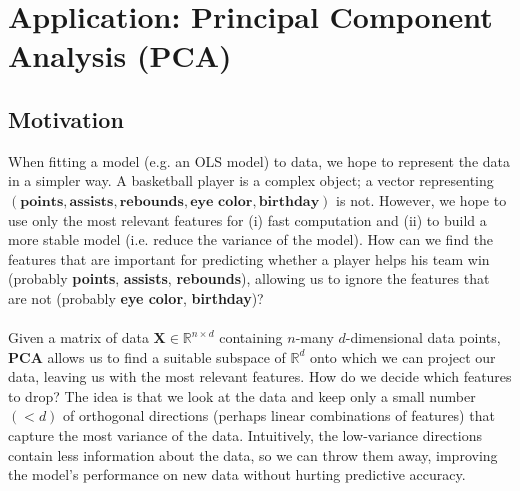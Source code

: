 \documentclass{article}
\begin{document}
\newpage
\section{Application: Principal Component Analysis (PCA)}
\subsection*{Motivation}
When fitting a model (e.g. an OLS model) to data, we hope to represent the data in a simpler way. A basketball player is a complex object; a vector representing $(\textbf{points}, \textbf{assists}, \textbf{rebounds}, \textbf{eye color}, \textbf{birthday})$ is not. However, we hope to use only the most relevant features for (i) fast computation and (ii) to build a more stable model (i.e. reduce the variance of the model). How can we find the features that are important for predicting whether a player helps his team win (probably \textbf{points}, \textbf{assists}, \textbf{rebounds}), allowing us to ignore the features that are not (probably \textbf{eye color}, \textbf{birthday})?
\\ \\
Given a matrix of data $\textbf{X} \in \mathbb{R}^{n \times d}$ containing $n$-many $d$-dimensional data points, \textbf{PCA} allows us to find a suitable subspace of $\mathbb{R}^d$ onto which we can project our data, leaving us with the most relevant features. How do we decide which features to drop? The idea is that we look at the data and keep only a small number $(< d)$ of orthogonal directions (perhaps linear combinations of features) that capture the most variance of the data. Intuitively, the low-variance directions contain less information about the data, so we can throw them away, improving the model's performance on new data without hurting predictive accuracy.
\end{document}
